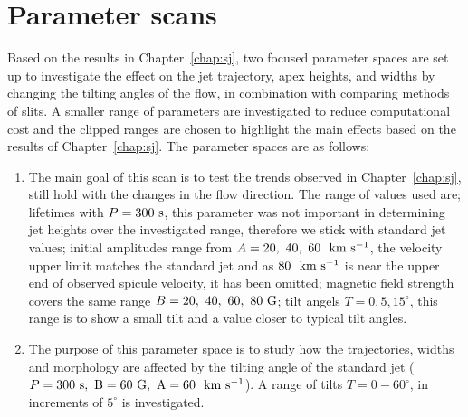 \documentclass[12pt]{ociamthesis}
\newcommand{\kms}{~\rm{km ~s^{-1}}}
\begin{document}
\section{Parameter scans}
\label{sec:pscansII}
Based on the results in Chapter~\ref{chap:sj}, two focused parameter spaces are set up to investigate the effect on the jet trajectory, apex heights, and widths by changing the tilting angles of the flow, in combination with comparing methods of slits. A smaller range of parameters are investigated to reduce computational cost and the clipped ranges are chosen to highlight the main effects based on the results of Chapter~\ref{chap:sj}. The parameter spaces are as follows:
\begin{enumerate}
\item The main goal of this scan is to test the trends observed in Chapter~\ref{chap:sj}, still hold with the changes in the flow direction. The range of values used are; lifetimes with $P=300~\rm{s}$, this parameter was not important in determining jet heights over the investigated range, therefore we stick with standard jet values; initial amplitudes range from $A=20,~40,~60~\kms$, the velocity upper limit matches the standard jet and as $80~\kms$ is near the upper end of observed spicule velocity, it has been omitted; magnetic field strength covers the same range $B=20,~40,~60,~80~\rm{G}$; tilt angels $T=0,5,15^{\circ}$, this range is to show a small tilt and a value closer to typical tilt angles.  

\item The purpose of this parameter space is to study how the trajectories, widths and morphology are affected by the tilting angle of the standard jet ($P=300~\rm{s}, ~B=60~\rm{G}, ~A=60~\kms$). A range of tilts $T=0-60^{\circ}$, in increments of $5^{\circ}$ is investigated.   
\end{enumerate}
%
\end{document}
